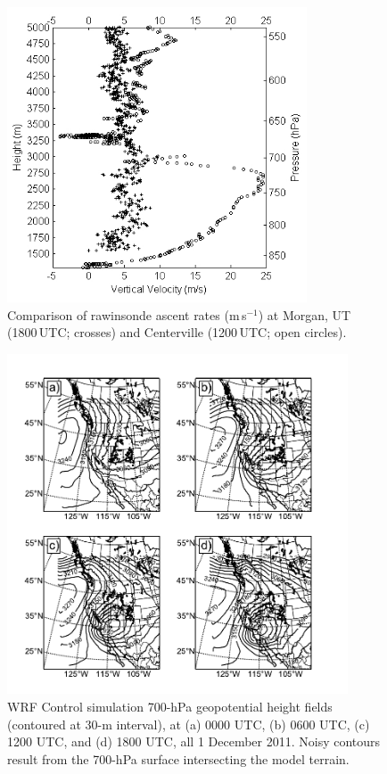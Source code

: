 \documentclass[pdftex,12pt]{article}
\def\mps{m\,s$^{-1}$}
\begin{document}
\begin{figure}[t]
\centering
\includegraphics[width=21pc,angle=0]{vertical_vel_crop}
\caption{Comparison of rawinsonde ascent rates (\mps) at Morgan, UT (1800\,UTC; crosses) and Centerville (1200\,UTC; open circles).}
\label{fig:ascent}
\end{figure}

\begin{figure}[t]
\centering
\includegraphics[width=0.9\textwidth]{WRF700.pdf}
\caption{WRF Control simulation 700-hPa geopotential height fields (contoured at 30-m interval), at (a) 0000 UTC, (b) 0600 UTC, (c) 1200 UTC, and (d) 1800 UTC, all 1 December 2011. Noisy contours result from the 700-hPa surface intersecting the model terrain.}
\label{fig:NAM-C_700}
\end{figure}
\end{document}
